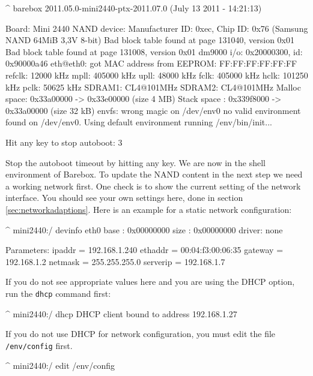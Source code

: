 \begin{ptxshell}[escapechar=|]{^}
barebox 2011.05.0-mini2440-ptx-2011.07.0 (July  13 2011 - 14:21:13)

Board: Mini 2440
NAND device: Manufacturer ID: 0xec, Chip ID: 0x76 (Samsung NAND 64MiB 3,3V 8-bit)
Bad block table found at page 131040, version 0x01
Bad block table found at page 131008, version 0x01
dm9000 i/o: 0x20000300, id: 0x90000a46
eth@eth0: got MAC address from EEPROM: FF:FF:FF:FF:FF:FF
refclk:    12000 kHz
mpll:     405000 kHz
upll:      48000 kHz
fclk:     405000 kHz
hclk:     101250 kHz
pclk:      50625 kHz
SDRAM1:   CL4@101MHz
SDRAM2:   CL4@101MHz
Malloc space: 0x33a00000 -> 0x33e00000 (size  4 MB)
Stack space : 0x339f8000 -> 0x33a00000 (size 32 kB)
envfs: wrong magic on /dev/env0
no valid environment found on /dev/env0. Using default environment
running /env/bin/init...

Hit any key to stop autoboot:  3
\end{ptxshell}

Stop the autoboot timeout by hitting any key. We are now in the shell
environment of Barebox. To update the NAND content in the next step we need
a working network first. One check is to show the current setting of the
network interface. You should see your own settings here, done in section
\ref{sec:networkadaptions}. Here is an example for a static network configuration:

\begin{ptxshell}[escapechar=|]{^}
mini2440:/ devinfo eth0
base  : 0x00000000
size  : 0x00000000
driver: none

Parameters:
          ipaddr = 192.168.1.240
         ethaddr = 00:04:f3:00:06:35
         gateway = 192.168.1.2
         netmask = 255.255.255.0
        serverip = 192.168.1.7
\end{ptxshell}

If you do not see appropriate values here and you are using the DHCP option, run
the \texttt{dhcp} command first:

\begin{ptxshell}[escapechar=|]{^}
mini2440:/ dhcp
DHCP client bound to address 192.168.1.27
\end{ptxshell}

If you do not use DHCP for network configuration, you must edit the file
\texttt{/env/config} first.

\begin{ptxshell}[escapechar=|]{^}
mini2440:/ edit /env/config
\end{ptxshell}

